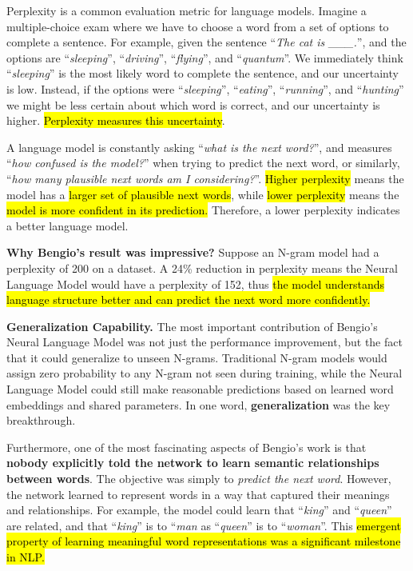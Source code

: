 \begin{deepeningbox}
    Perplexity is a common evaluation metric for language models. Imagine a multiple-choice exam where we have to choose a word from a set of options to complete a sentence. For example, given the sentence ``\emph{The cat is \_\_\_.}'', and the options are ``\emph{sleeping}'', ``\emph{driving}'', ``\emph{flying}'', and ``\emph{quantum}''. We immediately think ``\emph{sleeping}'' is the most likely word to complete the sentence, and our uncertainty is low. Instead, if the options were ``\emph{sleeping}'', ``\emph{eating}'', ``\emph{running}'', and ``\emph{hunting}'' we might be less certain about which word is correct, and our uncertainty is higher. \hl{Perplexity measures this uncertainty}.

    \highspace
    A language model is constantly asking ``\emph{what is the next word?}'', and  measures ``\emph{how confused is the model?}'' when trying to predict the next word, or similarly, ``\emph{how many plausible next words am I considering?}''. \hl{Higher perplexity} means the model has a \hl{larger set of plausible next words}, while \hl{lower perplexity} means the \hl{model is more confident in its prediction.} Therefore, a lower perplexity indicates a better language model.

    \highspace
    \textcolor{Green3}{ \textbf{Why Bengio's result was impressive?}} Suppose an N-gram model had a perplexity of 200 on a dataset. A 24\% reduction in perplexity means the Neural Language Model would have a perplexity of 152, thus \hl{the model understands language structure better and can predict the next word more confidently.}
\end{deepeningbox}

\highspace
\textcolor{Green3}{ \textbf{Generalization Capability.}} The most important contribution of Bengio's Neural Language Model was not just the performance improvement, but the fact that it could generalize to unseen N-grams. Traditional N-gram models would assign zero probability to any N-gram not seen during training, while the Neural Language Model could still make reasonable predictions based on learned word embeddings and shared parameters. In one word, \textbf{generalization} was the key breakthrough.

\highspace
Furthermore, one of the most fascinating aspects of Bengio's work is that \textbf{nobody explicitly told the network to learn semantic relationships between words}. The objective was simply to \emph{predict the next word}. However, the network learned to represent words in a way that captured their meanings and relationships. For example, the model could learn that ``\emph{king}'' and ``\emph{queen}'' are related, and that ``\emph{king}'' is to ``\emph{man} as ``\emph{queen}'' is to ``\emph{woman}''. This \hl{emergent property of learning meaningful word representations was a significant milestone in NLP.}

